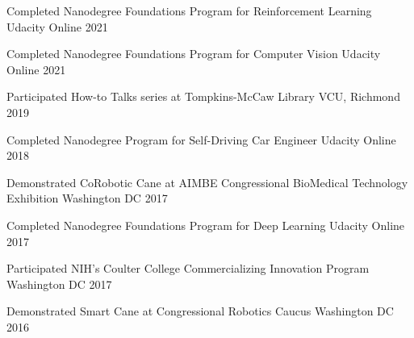 
\begin{cvhonors}
	\myevent
	{Completed Nanodegree Foundations Program for Reinforcement Learning}
	{Udacity Online}
	{2021}
	
	\myevent
	{Completed Nanodegree Foundations Program for Computer Vision}
	{Udacity Online}
	{2021}
	
	\myevent
	{Participated How-to Talks series at Tompkins-McCaw Library}
	{VCU, Richmond}
	{2019}
	
	\myevent
	{Completed Nanodegree Program for Self-Driving Car Engineer}
	{Udacity Online}
	{2018}
	
	\myevent
	{Demonstrated CoRobotic Cane at AIMBE Congressional BioMedical Technology Exhibition}
	{Washington DC}
	{2017}
	
	\myevent
	{Completed Nanodegree Foundations Program for Deep Learning}
	{Udacity Online}
	{2017}
	
	\myevent
	{Participated NIH’s Coulter College Commercializing Innovation Program}
	{Washington DC}
	{2017}
	
	\myevent
	{Demonstrated Smart Cane at Congressional Robotics Caucus}
	{Washington DC}
	{2016}
	
	
\end{cvhonors}




